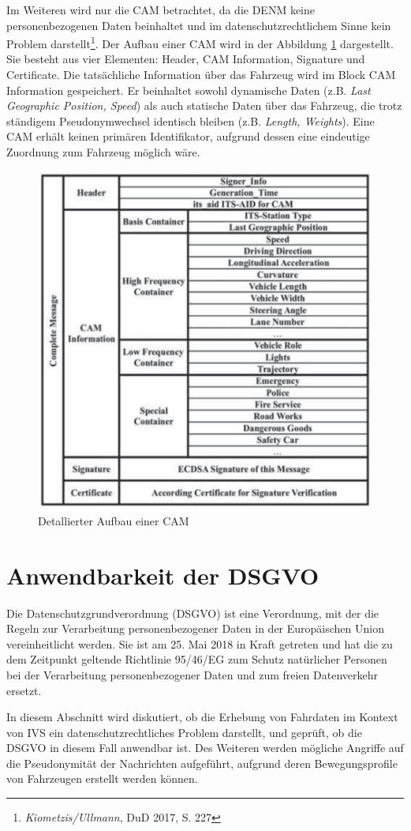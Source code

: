 Im Weiteren wird nur die CAM betrachtet, da die DENM keine personenbezogenen Daten beinhaltet und im datenschutzrechtlichem Sinne kein Problem darstellt\footnote{\emph{Kiometzis/Ullmann}, DuD 2017, S. 227}\nocite{Kiometzis2017}. Der Aufbau einer CAM wird in der Abbildung \ref{fig:cam} dargestellt. Sie besteht aus vier Elementen: Header, CAM Information, Signature und Certificate. Die tatsächliche Information über das Fahrzeug wird im Block CAM Information gespeichert. Er beinhaltet sowohl dynamische Daten (z.B. \textit{Last Geographic Position, Speed}) als auch statische Daten über das Fahrzeug, die trotz ständigem Pseudonymwechsel identisch bleiben (z.B. \textit{Length, Weights}). Eine CAM erhält keinen primären Identifikator, aufgrund dessen eine eindeutige Zuordnung zum Fahrzeug möglich wäre.

\begin{figure}
	\centering
	\includegraphics[width=0.4\linewidth]{images/CAM}
	\caption[Detallierter Aufbau einer CAM]{Detallierter Aufbau einer CAM\footnotemark}
	\label{fig:cam}
\end{figure}


\section{Anwendbarkeit der DSGVO}
\label{ch:SecondContentSection}

Die Datenschutzgrundverordnung (DSGVO) ist eine Verordnung, mit der die Regeln zur Verarbeitung personenbezogener Daten in der Europäischen Union vereinheitlicht werden. Sie ist am 25. Mai 2018 in Kraft getreten und hat die zu dem Zeitpunkt geltende Richtlinie 95/46/EG zum Schutz natürlicher Personen bei der Verarbeitung personenbezogener Daten und zum freien Datenverkehr ersetzt. 

In diesem Abschnitt wird diskutiert, ob die Erhebung von Fahrdaten im Kontext von IVS ein datenschutzrechtliches Problem darstellt, und geprüft, ob die DSGVO in diesem Fall anwendbar ist. Des Weiteren werden mögliche Angriffe auf die Pseudonymität der Nachrichten aufgeführt, aufgrund deren Bewegungsprofile von Fahrzeugen erstellt werden können. 

